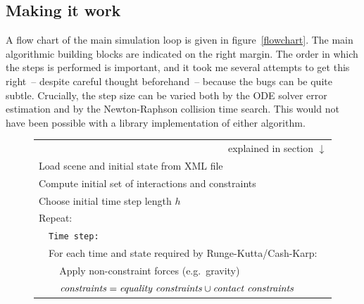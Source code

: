 \subsection{Making it work\label{algorithmImplementation}}

A flow chart of the main simulation loop is given in figure~\ref{flowchart}. The main algorithmic
building blocks are indicated on the right margin. The order in which the steps is performed is
important, and it took me several attempts to get this right~-- despite careful thought
beforehand~-- because the bugs can be quite subtle. Crucially, the step size can be varied both
by the ODE solver error estimation and by the Newton-Raphson collision time search. This would
not have been possible with a library implementation of either algorithm.

\begin{figure}
\renewcommand{\baselinestretch}{1.25}\small\normalsize
\newcommand{\spx}{\vspace*{\baselineskip}\\}
\newcommand{\curly}[2]{\zerobox{b}{\mbox{$\left\}\:#1\begin{array}{l}#2\end{array}\right.$}}}
\begin{tabular}{|l|l|l|l|@{}l}
\multicolumn{5}{r}{explained in section $\downarrow$}\\\cline{1-4}
\multicolumn{4}{|l|}{Load scene and initial state from XML file}
&\curly{\ref{softwareTools}}{\spx}\hspace*{7mm}\\\cline{1-4}
\multicolumn{4}{|l|}{Compute initial set of interactions and constraints}&
\curly{\ref{meshIntersection}}{\spx}\\\cline{1-4}
\multicolumn{4}{|l|}{Choose initial time step length $h$}\\\cline{1-4}
\multicolumn{4}{|l|}{Repeat:}\\\cline{2-4}
    &\multicolumn{3}{|l|}{\texttt{Time step:}}\\\cline{2-4}
    &\multicolumn{3}{|l|}{For each time and state required by Runge-Kutta/Cash-Karp:}&
    \curly{\ref{solvingODEs}}{\spx}\\\cline{3-4}
        &&\multicolumn{2}{|l|}{Apply non-constraint forces (e.g.\ gravity)}\\\cline{3-4}
        &&\multicolumn{2}{|l|}{$\mbox{\textit{constraints}} = \mbox{\textit{equality constraints}}
        \cup \mbox{\textit{contact constraints}}$}\\\cline{3-4}

\end{tabular}
\end{figure}
